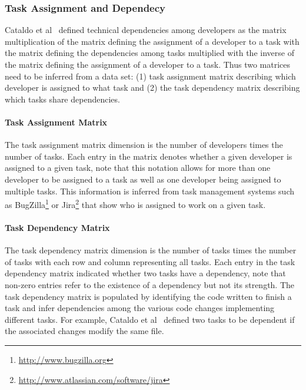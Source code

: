 \subsubsection{Task Assignment and Dependecy}
Cataldo et al~\cite{cataldo:cscw:2006} defined  technical dependencies among developers as the matrix multiplication of the matrix defining the assignment of a developer to a task with the matrix defining the dependencies among tasks multiplied with the inverse of the matrix defining the assignment of a developer to a task.
Thus two matrices need to be inferred from a data set: (1) task assignment matrix describing which developer is assigned to what task and (2) the task dependency matrix describing which tasks share dependencies.

\paragraph{Task Assignment Matrix}
The task assignment matrix dimension is the number of developers times the number of tasks.
Each entry in the matrix denotes whether a given developer is assigned to a given task, note that this notation allows for more than one developer to be assigned to a task as well as one developer being assigned to multiple tasks.
This information is inferred from task management systems such as BugZilla\footnote{\url{http://www.bugzilla.org}} or Jira\footnote{\url{http://www.atlassian.com/software/jira}} that show who is assigned to work on a given task.

\paragraph{Task Dependency Matrix}
The task dependency matrix dimension is the number of tasks times the number of tasks with each row and column representing all tasks.
Each entry in the task dependency matrix indicated whether two tasks have a dependency, note that non-zero entries refer to the existence of a dependency but not its strength.
The task dependency matrix is populated by identifying the code written to finish a task and infer dependencies among the various code changes implementing different tasks.
For example, Cataldo et al~\cite{cataldo:cscw:2006} defined two tasks to be dependent if the associated changes modify the same file. 

